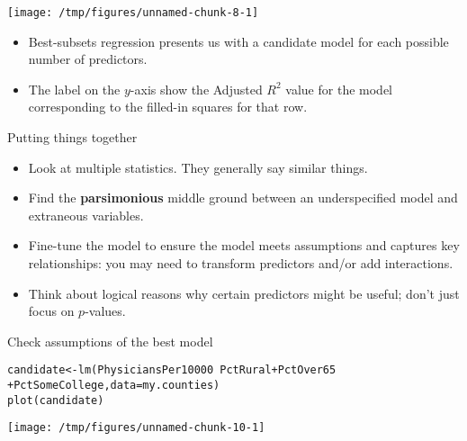 \documentclass{beamer}\usepackage[]{graphicx}\usepackage[]{color}
\makeatletter
\def\maxwidth{ %
  \ifdim\Gin@nat@width>\linewidth
    \linewidth
  \else
    \Gin@nat@width
  \fi
}
\newcommand{\hlopt}[1]{\textcolor[rgb]{1,0.894,0.769}{#1}}%
\newcommand{\hlstd}[1]{\textcolor[rgb]{1,0.894,0.769}{#1}}%
\newcommand{\hlkwb}[1]{\textcolor[rgb]{0.804,0.776,0.451}{#1}}%
\newcommand{\hlkwc}[1]{\textcolor[rgb]{0.78,0.941,0.545}{#1}}%
\newcommand{\hlkwd}[1]{\textcolor[rgb]{1,0.78,0.769}{#1}}%
\newenvironment{kframe}{%
 \def\at@end@of@kframe{}%
 \ifinner\ifhmode%
  \def\at@end@of@kframe{\end{minipage}}%
  \begin{minipage}{\columnwidth}%
 \fi\fi%
 \def\FrameCommand##1{\hskip\@totalleftmargin \hskip-\fboxsep
 \colorbox{shadecolor}{##1}\hskip-\fboxsep
     \hskip-\linewidth \hskip-\@totalleftmargin \hskip\columnwidth}%
 \MakeFramed {\advance\hsize-\width
   \@totalleftmargin\z@ \linewidth\hsize
   \@setminipage}}%
 {\par\unskip\endMakeFramed%
 \at@end@of@kframe}
\newenvironment{knitrout}{}{} %
\makeatother
\begin{document}
\begin{darkframes}
    \begin{frame}
      \vspace{-1in}
\begin{knitrout}
\color{fgcolor}
\texttt{[image: /tmp/figures/unnamed-chunk-8-1]} 

\end{knitrout}
    \end{frame}

    \begin{frame}
      \begin{itemize}
        \item Best-subsets regression presents us with a candidate model for each possible number of predictors.
        \item The label on the $y$-axis show the Adjusted $R^2$ value for the model corresponding to the filled-in squares for that row.
      \end{itemize}
    \end{frame}

    \begin{frame}{Putting things together}
      \begin{itemize}[<+->]
        \item Look at multiple statistics. They generally say similar things.
        \item Find the \textbf{parsimonious} middle ground between an underspecified model and extraneous variables.
        \item Fine-tune the model to ensure the model meets assumptions and captures key relationships: you may need to transform predictors and/or add interactions.
        \item Think about logical reasons why certain predictors might be useful; don't just focus on $p$-values.
      \end{itemize}
    \end{frame}

    \begin{frame}[fragile]{Check assumptions of the best model}
      \fontsm

\begin{knitrout}
\color{fgcolor}\begin{kframe}
\begin{alltt}
\hlstd{candidate} \hlkwb{<-} \hlkwd{lm}\hlstd{(PhysiciansPer10000} \hlopt{~} \hlstd{PctRural} \hlopt{+} \hlstd{PctOver65}
                  \hlopt{+} \hlstd{PctSomeCollege,} \hlkwc{data}\hlstd{=my.counties)}
\hlkwd{plot}\hlstd{(candidate)}
\end{alltt}
\end{kframe}
\texttt{[image: /tmp/figures/unnamed-chunk-10-1]} 


\end{knitrout}
\end{frame}
\end{darkframes}
\end{document}
